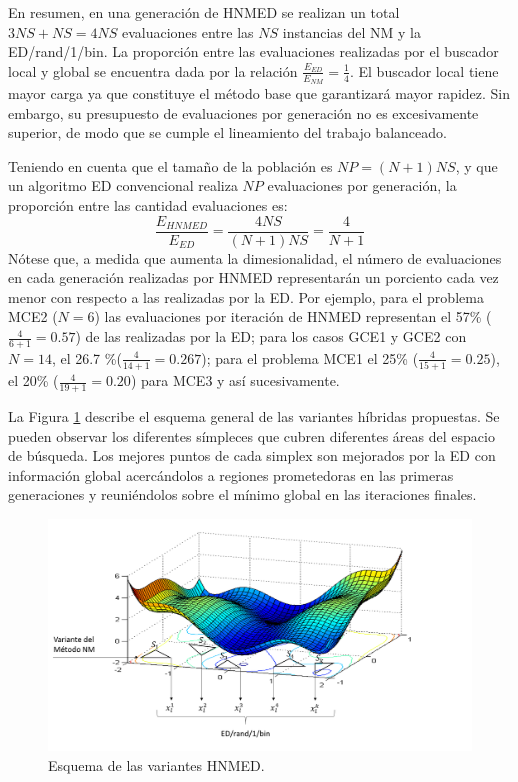 En resumen, en una generación de HNMED se realizan un total $3NS+NS=4NS$ evaluaciones entre las $NS$ instancias del NM y la ED/rand/1/bin. La proporción entre las evaluaciones realizadas por el buscador local y global se encuentra dada por la relación $\frac{E_{ED}}{E_{NM}}=\frac{1}{4}$. El buscador local tiene mayor carga ya que constituye el método base que garantizará mayor rapidez. Sin embargo, su presupuesto de evaluaciones por generación no es excesivamente superior, de modo que se cumple el lineamiento del trabajo balanceado. 

Teniendo en cuenta que el tamaño de la población es $NP=(N+1)NS$, y que un algoritmo ED convencional realiza $NP$ evaluaciones por generación, la proporción entre las cantidad evaluaciones es:
\begin{equation}\label{eq:relación de evaluaciones}
\frac{E_{HNMED}}{E_{ED}}=\frac{4NS}{(N+1)NS}=\frac{4}{N+1}
\end{equation}
Nótese que, a medida que aumenta la dimesionalidad, el número de evaluaciones en cada generación realizadas por HNMED representarán un porciento cada vez menor con respecto a las realizadas por la ED. Por ejemplo, para el problema MCE2 ($N=6$) las evaluaciones por iteración de HNMED representan el 57\% ($\frac{4}{6+1}=0.57$) de las realizadas por la ED; para los casos GCE1 y GCE2 con $N=14$, el 26.7 \%($\frac{4}{14+1}=0.267$); para el problema MCE1 el 25\% ($\frac{4}{15+1}=0.25$), el 20\% ($\frac{4}{19+1}=0.20$) para MCE3 y así sucesivamente.

La Figura \ref{fig:HNMED} describe el esquema general de las variantes híbridas propuestas. Se pueden observar los diferentes símpleces que cubren diferentes áreas del espacio de búsqueda. Los mejores puntos de cada simplex son mejorados por la ED con información global acercándolos a regiones prometedoras en las primeras generaciones y reuniéndolos sobre el mínimo global en las iteraciones finales.

	\begin{figure}[htb]
		\begin{center}
		\includegraphics[width=\textwidth]{Figures/Esquema}
		\caption{Esquema de las variantes HNMED.}
		\label{fig:HNMED}
	\end{center}
	\end{figure}


